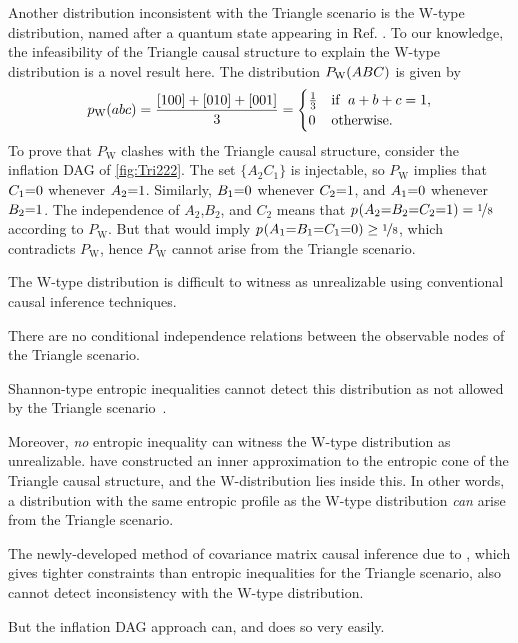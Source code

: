 \par\smallskip\nobreak
Another distribution inconsistent with the Triangle scenario is the W-type distribution, named after a quantum state appearing in Ref. \cite{3Qubits2Ways}. To our knowledge, the infeasibility of the Triangle causal structure to explain the W-type distribution is a novel result here. The distribution $P_{\text{W}}\lparen A B C\rparen$ is given by
\begin{align}\label{eq:wdistribution1}
p_{\text{W}}\lparen a b c\rparen=\frac{[100]+[010]+[001]}{3}=\begin{cases}\tfrac{1}{3}&\text{if }\; a+b+c=1, \\ 0&\text{otherwise}.\end{cases}
\end{align}
To prove that  $P_{\text{W}}$ clashes with the Triangle causal structure, consider the inflation DAG of \cref{fig:Tri222}. The set $\{A_2 C_1\}$ is injectable, so $P_{\text{W}}$ implies that $C_1\mathord{=} 0$ whenever $A_2 \mathord{=} 1$. Similarly, $B_1\mathord{=} 0$ whenever $C_2\mathord{=} 1$, and $A_1\mathord{=} 0$ whenever $B_2\mathord{=} 1$. The independence of $A_2$,$B_2$, and $C_2$ means that ${p_{}}\lparen A_2\mathord{=} B_2\mathord{=} C_2\mathord{=} 1\rparen=\nicefrac{1}{8}$ according to $P_{\text{W}}$. But that would imply ${p_{}}\lparen A_1\mathord{=} B_1\mathord{=} C_1\mathord{=} 0\rparen\geq\nicefrac{1}{8}$, which contradicts $P_{\text{W}}$, hence $P_{\text{W}}$ cannot arise from the Triangle scenario.

The W-type distribution is difficult to witness as unrealizable using conventional causal inference techniques.
\begin{compactenum}
\item There are no conditional independence relations between the observable nodes of the Triangle scenario. %
\item Shannon-type entropic inequalities cannot detect this distribution as not allowed by the Triangle scenario~\cite{fritz2013marginal,chaves2014novel,chaves2014informationinference}. 
\item Moreover, \emph{no} entropic inequality can witness the W-type distribution as unrealizable. \citet{weilenmann2016entropic} have constructed an inner approximation to the entropic cone of the Triangle causal structure, and the W-distribution lies inside this. In other words, a distribution with the same entropic profile as the W-type distribution \emph{can} arise from the Triangle scenario.
\item The newly-developed method of covariance matrix causal inference due to \citet{kela2016covariance}, which gives tighter constraints than entropic inequalities for the Triangle scenario, also cannot detect inconsistency with the W-type distribution.
\end{compactenum}
\par\noindent But the inflation DAG approach can, and does so very easily.


